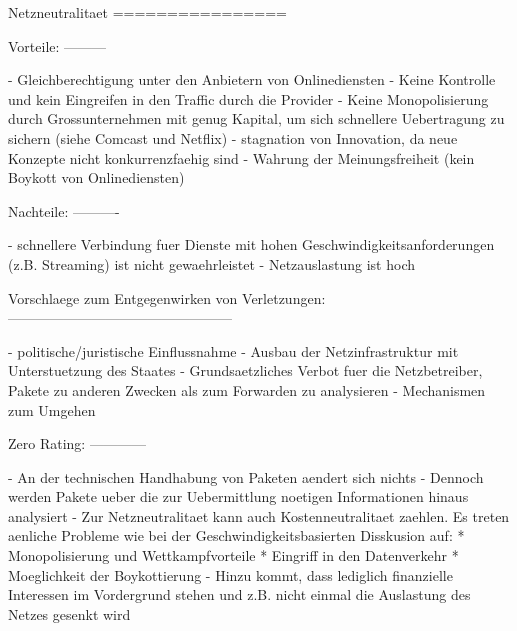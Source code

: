 Netzneutralitaet
================

    Vorteile:
    ---------

        - Gleichberechtigung unter den Anbietern von Onlinediensten
        - Keine Kontrolle und kein Eingreifen in den Traffic durch die Provider
        - Keine Monopolisierung durch Grossunternehmen mit genug Kapital, um sich schnellere Uebertragung zu sichern (siehe Comcast und Netflix)
        - stagnation von Innovation, da neue Konzepte nicht konkurrenzfaehig sind
        - Wahrung der Meinungsfreiheit (kein Boykott von Onlinediensten)


    Nachteile:
    ----------

        - schnellere Verbindung fuer Dienste mit hohen Geschwindigkeitsanforderungen (z.B. Streaming) ist nicht gewaehrleistet
        - Netzauslastung ist hoch

    Vorschlaege zum Entgegenwirken von Verletzungen:
    ------------------------------------------------

        - politische/juristische Einflussnahme
        - Ausbau der Netzinfrastruktur mit Unterstuetzung des Staates
        - Grundsaetzliches Verbot fuer die Netzbetreiber, Pakete zu anderen Zwecken als zum Forwarden zu analysieren
        - Mechanismen zum Umgehen 

    Zero Rating:
    ------------

        - An der technischen Handhabung von Paketen aendert sich nichts
        - Dennoch werden Pakete ueber die zur Uebermittlung noetigen Informationen hinaus analysiert
        - Zur Netzneutralitaet kann auch Kostenneutralitaet zaehlen. Es treten aenliche Probleme wie bei der Geschwindigkeitsbasierten Disskusion auf:
            * Monopolisierung und Wettkampfvorteile
            * Eingriff in den Datenverkehr
            * Moeglichkeit der Boykottierung
        - Hinzu kommt, dass lediglich finanzielle Interessen im Vordergrund stehen und z.B. nicht einmal die Auslastung des Netzes gesenkt wird

